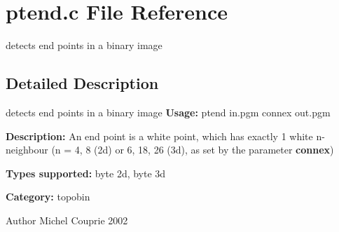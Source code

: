 \section{ptend.c File Reference}
\label{ptend_8c}


detects end points in a binary image  




\subsection{Detailed Description}
detects end points in a binary image {\bfseries Usage:} ptend in.pgm connex out.pgm

{\bfseries Description:} An end point is a white point, which has exactly 1 white n-\/neighbour (n = 4, 8 (2d) or 6, 18, 26 (3d), as set by the parameter {\bfseries connex})

{\bfseries Types supported:} byte 2d, byte 3d

{\bfseries Category:} topobin

\begin{DoxyAuthor}{Author}
Michel Couprie 2002 
\end{DoxyAuthor}
